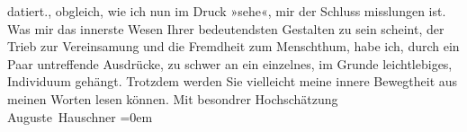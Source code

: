 \begin{ledgroupsized}[t]{13cm}
{{{                  datiert.}}}\label{K_L02587-1h}, obgleich, wie ich nun im Druck »sehe«,  mir der Schluss misslungen ist. Was mir das innerste Wesen Ihrer
               bedeutendsten Gestalten zu sein scheint, {\pb}der Trieb zur
               Vereinsamung und die Fremdheit zum Menschthum, habe ich, durch ein Paar untreffende
               Ausdrücke, zu schwer an ein einzelnes, im Grunde leichtlebiges, Individuum gehängt.
               Trotzdem werden Sie vielleicht meine innere Bewegtheit aus meinen Worten lesen
               können.\pend
           \pstart
           Mit besondrer Hochschätzung{\\[\baselineskip]}\spacefill\mbox{Auguste Hauschner}\pend
           \leftskip=0em{}\endnumbering{}\end{ledgroupsized}  \newcommand{\dateiname}{L02587}\newcommand{\titel}{Auguste Hauschner an Arthur Schnitzler, 16. 1. 1909}\newcommand{\editorInnen}{Martin Anton Müller und Laura Untner}
      